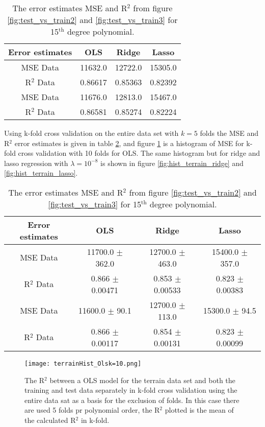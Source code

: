\documentclass[uio,jmp,amsmath,amssymb,reprint,nofootinbib]{revtex4-1}
\numberwithin{equation}{section}
\begin{document}
\begin{table}
\begin{tabular}{|c|c|c|c|}\hline
Error estimates & OLS & Ridge & Lasso\\ \hline
MSE Data & 11632.0 & 12722.0 & 15305.0 \\ \hline
R\(^2\) Data & 0.86617 & 0.85363 & 0.82392 \\ \hline
MSE Data & 11676.0 & 12813.0 & 15467.0 \\ \hline
R\(^2\) Data & 0.86581 & 0.85274 & 0.82224 \\ \hline
\end{tabular}
\caption{The error estimates MSE and R\(^2\) from figure \ref{fig:test_vs_train2} and \ref{fig:test_vs_train3} for 15\(^\text{th}\) degree polynomial.}
\label{tab:11}
\end{table}

Using k-fold cross validation on the entire data set with \(k=5\) folds the MSE and R\(^2\) error estimates is given in table \ref{tab:12}, and figure \ref{fig:hist_terrain_ols} is a histogram of MSE for k-fold cross validation with 10 folds for OLS. The same histogram but for ridge and lasso regression with \(\lambda = 10^{-8}\) is shown in figure \ref{fig:hist_terrain_ridge} and \ref{fig:hist_terrain_lasso}.

\begin{table}
\begin{tabular}{|c|c|c|c|}\hline
Error estimates & OLS & Ridge & Lasso\\ \hline
MSE Data & 11700.0 \(\pm\) 362.0 & 12700.0 \(\pm\) 463.0 & 15400.0 \(\pm\) 357.0 \\ \hline
R\(^2\) Data & 0.866 \(\pm\) 0.00471 & 0.853 \(\pm\) 0.00533 & 0.823 \(\pm\) 0.00383 \\ \hline
MSE Data & 11600.0 \(\pm\) 90.1 & 12700.0 \(\pm\) 113.0 & 15300.0 \(\pm\) 94.5 \\ \hline
R\(^2\) Data & 0.866 \(\pm\) 0.00117 & 0.854 \(\pm\) 0.00131 & 0.823 \(\pm\) 0.00099 \\ \hline
\end{tabular}
\caption{The error estimates MSE and R\(^2\) from figure \ref{fig:test_vs_train2} and \ref{fig:test_vs_train3} for 15\(^\text{th}\) degree polynomial.}
\label{tab:12}
\end{table}

\begin{figure}[H]
    \centering
    \texttt{[image: terrainHist\_Olsk=10.png]}
    \caption{The R\(^2\) between a OLS model for the terrain data set and both the training and test data separately in k-fold cross validation using the entire data sat as a basis for the exclusion of folds. In this case there are used 5 folds pr polynomial order, the R\(^2\) plotted is the mean of the calculated R\(^2\) in k-fold.}
    \label{fig:hist_terrain_ols}
\end{figure}
\end{document}
